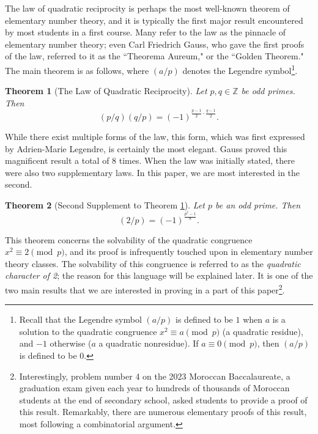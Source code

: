 \documentclass[10pt]{amsart}
\theoremstyle{plain}
\newtheorem{thm}{Theorem}
\theoremstyle{definition}
\theoremstyle{remark}
\numberwithin{equation}{section}
\begin{document}
\indent The law of quadratic reciprocity is perhaps the most well-known theorem of elementary number theory, and it is typically the first major result encountered by most students in a first course. Many refer to the law as the pinnacle of elementary number theory; even Carl Friedrich Gauss, who gave the first proofs of the law, referred to it as the ``Theorema Aureum," or the ``Golden Theorem." The main theorem is as follows, where $(a/p)$ denotes the Legendre symbol\footnote{Recall that the Legendre symbol $(a/p)$ is defined to be $1$ when $a$ is a solution to the quadratic congruence $x^{2}\equiv a\pmod{p}$ (a quadratic residue), and $-1$ otherwise ($a$ a quadratic nonresidue). If $a\equiv 0\pmod{p}$, then $(a/p)$ is defined to be $0$.}.
\begin{thm}[The Law of Quadratic Reciprocity] \label{the law of quadratic reciprocity}
    Let $p,q\in\mathbb{Z}$ be odd primes. Then
        \begin{equation*}
            (p/q)(q/p) =(-1)^{\frac{p-1}{2}\cdot\frac{q-1}{2}}.
        \end{equation*}
\end{thm}
While there exist multiple forms of the law, this form, which was first expressed by Adrien-Marie Legendre, is certainly the most elegant. Gauss proved this magnificent result a total of 8 times. When the law was initially stated, there were also two supplementary laws. In this paper, we are most interested in the second.
\begin{thm}[Second Supplement to Theorem \ref{the law of quadratic reciprocity}] \label{supplement to quadratic reciprocity}
    Let $p$ be an odd prime. Then
        \begin{equation*}
            (2/p) = (-1)^{\frac{p^{2}-1}{8}}.
        \end{equation*}
\end{thm}
This theorem concerns the solvability of the quadratic congruence $x^{2}\equiv 2\pmod{p}$, and its proof is infrequently touched upon in elementary number theory classes. The solvability of this congruence is referred to as the \textit{quadratic character of 2}; the reason for this language will be explained later. It is one of the two main results that we are interested in proving in a part of this paper\footnote{Interestingly, problem number 4 on the 2023 Moroccan Baccalaureate, a graduation exam given each year to hundreds of thousands of Moroccan students at the end of secondary school, asked students to provide a proof of this result. Remarkably, there are numerous elementary proofs of this result, most following a combinatorial argument.}.
\end{document}
